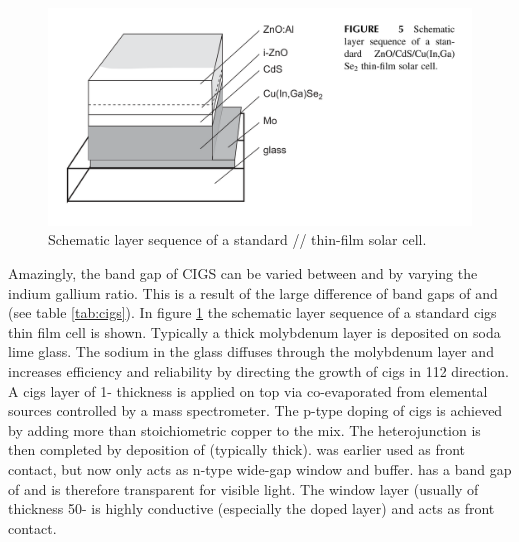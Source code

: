 \begin{figure}
	\includegraphics[width=\textwidth]{./Pics/cigs.png}
	\caption{Schematic layer sequence of a standard // thin-film solar cell.}
	\label{fig:cigs}
\end{figure}


Amazingly, the band gap of CIGS can be varied between  and  by varying the indium gallium ratio.
This is a result of the large difference of band gaps of  and  (see table \ref{tab:cigs}). 
In figure \ref{fig:cigs} the schematic layer sequence of a standard \gls{cigs} thin film cell is shown. 
Typically a  thick molybdenum layer is deposited on soda lime glass. 
The sodium in the glass diffuses through the molybdenum layer and increases efficiency and reliability by directing the growth of \gls{cigs} in 112 direction\cite{hedstrom1993cigs}.
A \gls{cigs} layer of 1- thickness is applied on top via co-evaporated from elemental sources controlled by a mass spectrometer.\cite{hedstrom1993cigs}
The p-type doping of \gls{cigs} is achieved by adding more than stoichiometric copper to the mix. 
The heterojunction is then completed by deposition of  (typically  thick).
 was earlier used as front contact, but now only acts as n-type wide-gap window and buffer. 
 has a band gap of  and is therefore transparent for visible light. 
The  window layer (usually of thickness 50- is highly conductive (especially the  doped layer) and acts as front contact. 

